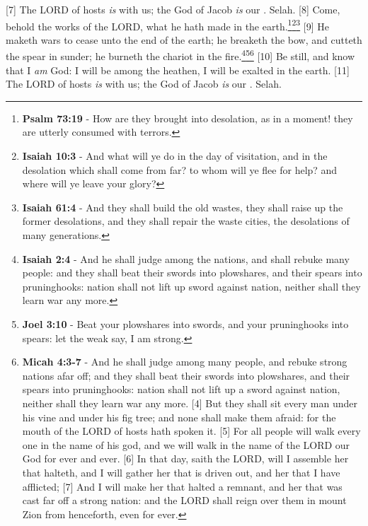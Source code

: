 [7] \textcolor[cmyk]{0.99998,1,0,0}{The LORD of hosts \emph{is} with us; the God of Jacob \emph{is} our . Selah.}
[8] \textcolor[cmyk]{0.99998,1,0,0}{Come, behold the works of the LORD, what  he hath made in the earth.}\footnote{\textbf{Psalm 73:19} - How are they brought into desolation, as in a moment! they are utterly consumed with terrors.}\footnote{\textbf{Isaiah 10:3} - And what will ye do in the day of visitation, and in the desolation which shall come from far? to whom will ye flee for help? and where will ye leave your glory?}\footnote{\textbf{Isaiah 61:4} - And they shall build the old wastes, they shall raise up the former desolations, and they shall repair the waste cities, the desolations of many generations.}
[9] \textcolor[cmyk]{0.99998,1,0,0}{He maketh wars to cease unto the end of the earth; he breaketh the bow, and cutteth the spear in sunder; he burneth the chariot in the fire.}\marginpar{\scriptsize \textcolor[rgb]{0.00,0.545,0.269}{Four things the Lord does:
\begin{compactenum}
\item Maketh wars to cease
\item Breaketh the bow
\item Cutteth the spear in sunder
\item Burneth the chariot in the fire
\end{compactenum}} }\footnote{\textbf{Isaiah 2:4} - And he shall judge among the nations, and shall rebuke many people: and they shall beat their swords into plowshares, and their spears into pruninghooks: nation shall not lift up sword against nation, neither shall they learn war any more.}\footnote{\textbf{Joel 3:10} - Beat your plowshares into swords, and your pruninghooks into spears: let the weak say, I am strong.}\footnote{\textbf{Micah 4:3-7} - And he shall judge among many people, and rebuke strong nations afar off; and they shall beat their swords into plowshares, and their spears into pruninghooks: nation shall not lift up a sword against nation, neither shall they learn war any more. [4] But they shall sit every man under his vine and under his fig tree; and none shall make them afraid: for the mouth of the LORD of hosts hath spoken it. [5] For all people will walk every one in the name of his god, and we will walk in the name of the LORD our God for ever and ever. [6] In that day, saith the LORD, will I assemble her that halteth, and I will gather her that is driven out, and her that I have afflicted; [7] And I will make her that halted a remnant, and her that was cast far off a strong nation: and the LORD shall reign over them in mount Zion from henceforth, even for ever.}
[10] \textcolor[cmyk]{0.99998,1,0,0}{Be still, and know that I \emph{am} God: I will be  among the heathen, I will be exalted in the earth.}
[11] \textcolor[cmyk]{0.99998,1,0,0}{The LORD of hosts \emph{is} with us; the God of Jacob \emph{is} our . Selah.}



